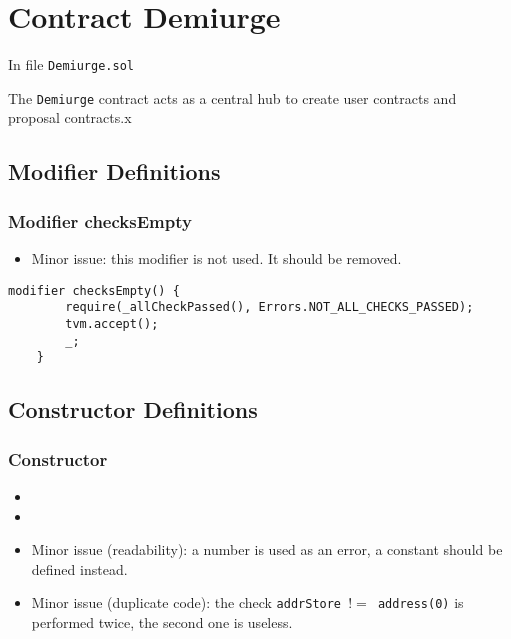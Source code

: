 
\chapter{Contract Demiurge}

\minitoc

In file {\tt Demiurge.sol}

The {\tt Demiurge} contract acts as a central hub to create user
contracts and proposal contracts.x

\section{Modifier Definitions}


\subsection{Modifier checksEmpty}

\begin{itemize}
\item Minor issue: this modifier is not used. It should be removed.
\end{itemize}

\begin{lstlisting}[firstnumber=66]
    modifier checksEmpty() {
        require(_allCheckPassed(), Errors.NOT_ALL_CHECKS_PASSED);
        tvm.accept();
        _;
    }
\end{lstlisting}

\section{Constructor Definitions}


\subsection{Constructor}

\begin{itemize}
\item {}
\item {}
\item Minor issue (readability): a number is used as an error, a
  constant should be defined instead.
\item Minor issue (duplicate code): the check {\tt addrStore $!=$
  address(0)} is performed twice, the second one is useless.
\end{itemize}

